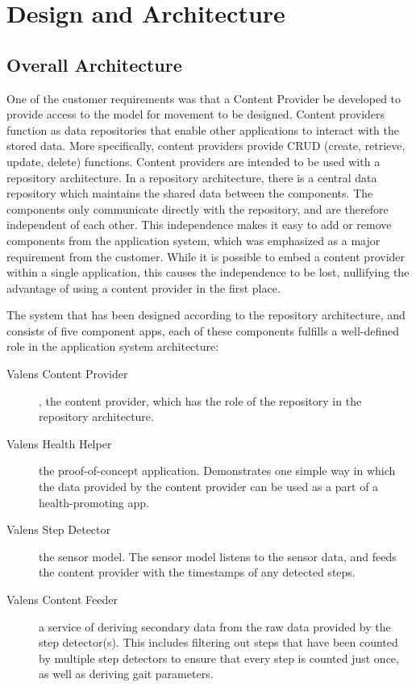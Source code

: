 \chapter{Design and Architecture}


\section{Overall Architecture}
One of the customer requirements was that a Content Provider be developed to provide access to the model for movement to be designed. Content providers function as data repositories that enable other applications to interact with the stored data. More specifically, content providers provide CRUD (create, retrieve, update, delete) functions. Content providers are intended to be used with a repository architecture. In a repository architecture, there is a central data repository which maintains the shared data between the components. The components only communicate directly with the repository, and are therefore independent of each other. This independence makes it easy to add or remove components from the application system, which was emphasized as a major requirement from the customer. While it is possible to embed a content provider within a single application, this causes the independence to be lost, nullifying the advantage of using a content provider in the first place.

The system that has been designed according to the repository architecture, and consists of five component apps, each of these components fulfills a well-defined role in the application system architecture:
\begin{description}
\item[Valens Content Provider], the content provider, which has the role of the repository in the repository architecture.
\item[Valens Health Helper] the proof-of-concept application. Demonstrates one simple way in which the data provided by the content provider can be used as a part of a health-promoting app.
\item[Valens Step Detector] the sensor model. The sensor model listens to the sensor data, and feeds the content provider with the timestamps of any detected steps.
\item[Valens Content Feeder] a service of deriving secondary data from the raw data provided by the step detector(s). This includes filtering out steps that have been counted by multiple step detectors to ensure that every step is counted just once, as well as deriving gait parameters.
\end{description}

